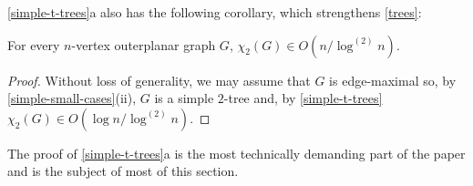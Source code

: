 \documentclass[kpfonts]{patmorin}
\newcommand{\trn}{\chi_2}
\theoremstyle{named}
\newcommand{\weirdref}[2]{\cref{#1}#2}
\begin{document}
\weirdref{simple-t-trees}{a} also has the following corollary, which strengthens \cref{trees}:

\begin{cor}\label{outerplanar}
    For every $n$-vertex outerplanar graph $G$, $\trn(G)\in O(n/\log^{(2)} n)$.
\end{cor}

\begin{proof}
    Without loss of generality, we may assume that $G$ is edge-maximal so, by \cref{simple-small-cases}{(ii)}, $G$ is a simple $2$-tree and, by \cref{simple-t-trees} $\trn(G)\in O(\log n/\log^{(2)} n)$.
\end{proof}

The proof of \weirdref{simple-t-trees}{a} is the most technically demanding part of the paper and is the subject of most of this section.
\end{document}
